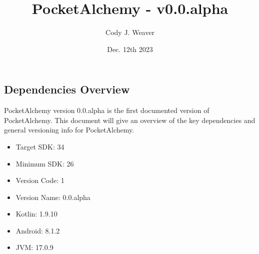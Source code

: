 \documentclass[12pt]{article}
\begin{document}
\title{PocketAlchemy - v0.0.alpha}
\author{Cody J. Weaver}
\date{Dec. 12th 2023}
\maketitle


\begin{center}
    
    \section*{Dependencies Overview}
    \indent PocketAlchemy version 0.0.alpha is the first documented version of PocketAlchemy. This document will give an overview of the 
    key dependencies and general versioning info for PocketAlchemy.

    \begin{itemize}
        \item Target SDK: 34
        \item Minimum SDK: 26
        \item Version Code: 1
        \item Version Name: 0.0.alpha
        \item Kotlin: 1.9.10
        \item Android: 8.1.2
        \item JVM\@: 17.0.9

    \end{itemize}

\end{center}
\end{document}
